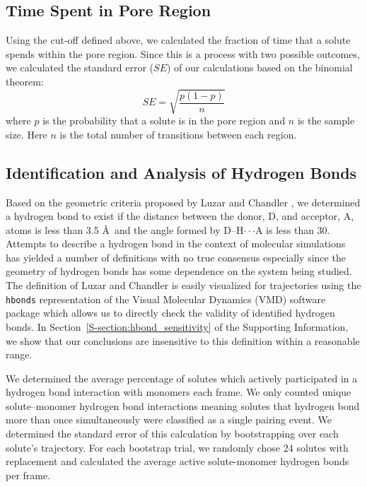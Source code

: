 \documentclass[journal=jpcbfk,manuscript=article]{achemso}
\begin{document}
  \subsection{Time Spent in Pore Region}
  
  Using the cut-off defined above, we calculated the fraction of time
  that a solute spends within the pore region. Since this is a process
  with two possible outcomes, we calculated the standard error ($SE$) of our
  calculations based on the binomial theorem: 
  \begin{equation}
  SE = \sqrt{\dfrac{p(1-p)}{n}}
  \end{equation}
  where $p$ is the probability that a solute is in the pore region and
  $n$ is the sample size. Here $n$ is the total number of transitions
  between each region. 
  
  \subsection{Identification and Analysis of Hydrogen Bonds}\label{method:hbonds}  %

  Based on the geometric criteria proposed by Luzar and Chandler 
  \cite{luzar_effect_1996}, we determined a hydrogen bond to exist if the
  distance between the donor, D, and acceptor, A, atoms is less than 
  3.5 \AA~and the angle formed by D--H$\cdot\cdot\cdot$A is less than 30\degree. Attempts
  to describe a hydrogen bond in the context of molecular simulations has
  yielded a number of definitions with no true consensus 
  \cite{prada-gracia_quest_2013} especially since the geometry of hydrogen
  bonds has some dependence on the system being studied. The definition of
  Luzar and Chandler is easily visualized for trajectories using the 
  \texttt{hbonds} representation of the Visual Molecular Dynamics (VMD) software 
  package which allows us to directly check the validity of identified hydrogen bonds.
  In Section~\ref{S-section:hbond_sensitivity} of the Supporting Information, we
  show that our conclusions are insensitive to this definition within a 
  reasonable range.
  
  We determined the average percentage of solutes which actively participated
  in a hydrogen bond interaction with monomers each frame. We only counted
  unique solute--monomer hydrogen bond interactions meaning solutes
  that hydrogen bond more than once simultaneously were classified as a
  single pairing event. We determined the standard error of this calculation
  by bootstrapping over each solute's trajectory. For each bootstrap trial,
  we randomly chose 24 solutes with replacement and calculated the average
  active solute-monomer hydrogen bonds per frame.
\end{document}
